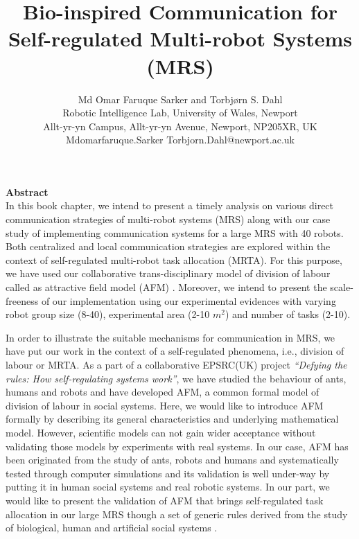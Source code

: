 \documentclass[10pt,a4paper]{article}
\author{Md Omar Faruque Sarker and Torbj{\o}rn S. Dahl\\ %
\small
Robotic Intelligence Lab, University of Wales, Newport\\
\small
Allt-yr-yn Campus, Allt-yr-yn Avenue, Newport, NP205XR, UK\\
\small
Mdomarfaruque.Sarker \vline  Torbjorn.Dahl@newport.ac.uk
}
\title{Bio-inspired Communication for Self-regulated Multi-robot Systems (MRS)}
\begin{document}
\maketitle
%
\textbf{\large Abstract}\\

In this book chapter, we intend to present a timely analysis on various direct communication strategies of multi-robot systems (MRS) along with our case study of implementing communication systems for a large MRS with 40 robots. Both centralized and local communication strategies are explored within the context of self-regulated multi-robot task allocation (MRTA). For this purpose, we have used our collaborative trans-disciplinary model of division of labour called as attractive field model (AFM) \cite{Arcaute+2008}. Moreover, we intend to present the scale-freeness of our implementation using our experimental evidences with varying robot group size (8-40), experimental area (2-10 $m^2$) and number of tasks (2-10).
 
In order to illustrate the suitable mechanisms for communication in MRS, we have put our work in the context of a self-regulated phenomena, i.e., division of labour or MRTA. As a part of a collaborative EPSRC(UK) project {\em ``Defying the rules: How self-regulating systems work''}, we have studied the behaviour of ants, humans and robots and have developed AFM, a common formal model of division of labour in social systems. Here, we would like to introduce AFM formally by describing its general characteristics and underlying mathematical model. However, scientific models can not gain wider acceptance without validating those models by experiments with real systems. In our case, AFM has been originated from the study of ants, robots and humans and systematically tested through computer simulations and its validation is well under-way by putting it in human social systems and real robotic systems. In our part, we would like to present the validation of AFM that brings self-regulated task allocation in our large MRS though a set of generic rules derived from the study of biological, human and artificial social systems \cite{Sarker+2010ants}.
 
\end{document}
